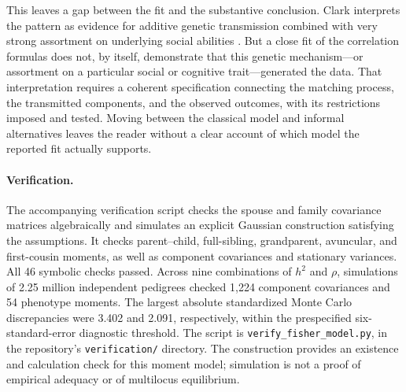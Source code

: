 This leaves a gap between the fit and the substantive conclusion.
Clark interprets the pattern as evidence for additive genetic
transmission combined with very strong assortment on underlying social
abilities \citep[pp.~16,75,286 and Technical Appendix]{Clark2026}.
But a close fit of the correlation formulas does not, by itself,
demonstrate that this genetic mechanism---or assortment on a particular
social or cognitive trait---generated the data. That interpretation
requires a coherent specification connecting the matching process,
the transmitted components, and the observed outcomes, with its
restrictions imposed and tested. Moving between the classical model
and informal alternatives leaves the reader without a clear account
of which model the reported fit actually supports.

\paragraph{Verification.}
The accompanying verification script checks the spouse and family
covariance matrices algebraically and simulates an explicit Gaussian
construction satisfying the assumptions. It checks parent--child,
full-sibling, grandparent, avuncular, and first-cousin moments, as well
as component covariances and stationary variances. All 46 symbolic checks passed. Across nine combinations of $h^2$ and
$\rho$, simulations of 2.25 million independent pedigrees checked 1,224
component covariances and 54 phenotype moments. The largest absolute
standardized Monte Carlo discrepancies were 3.402 and 2.091, respectively,
within the prespecified six-standard-error diagnostic threshold.
The script is \texttt{verify\_fisher\_model.py}, in the repository's
\texttt{verification/} directory. The construction
provides an existence and calculation check for this moment model;
simulation is not a proof of empirical adequacy or of multilocus
equilibrium.
